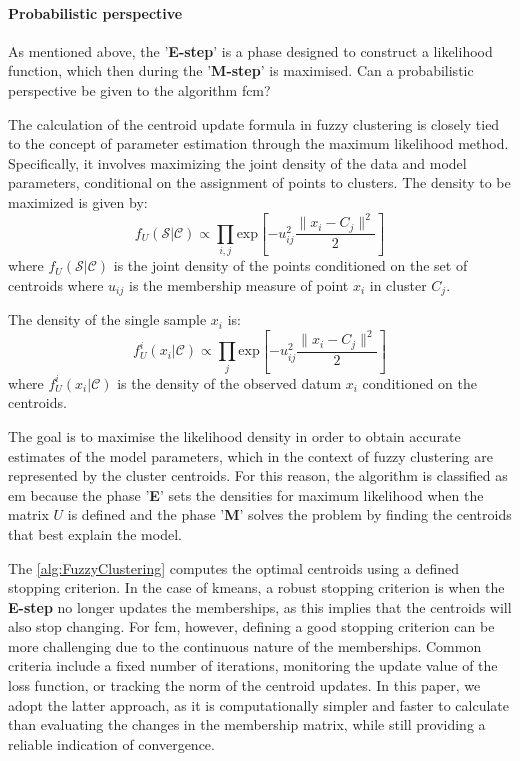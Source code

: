 \begin{remark}
	\paragraph{Probabilistic perspective}
	\begin{toReview}
	As mentioned above, the '\textbf{E-step}' is a phase designed to construct a likelihood function, which then during the '\textbf{M-step}' is maximised. Can a probabilistic perspective be given to the algorithm \gls{fcm}?
	\end{toReview}

	\noindent The calculation of the centroid update formula in fuzzy clustering is closely tied to the concept of parameter estimation through the maximum likelihood method. Specifically, it involves maximizing the joint density of the data and model parameters, conditional on the assignment of points to clusters.
	The density to be maximized is given by:
	\begin{equation*}
	    f_U(\mathcal{S}|\mathcal{C}) \propto \prod_{i,j}\text{exp}\left[-u_{ij}^2\frac{\|x_i-C_j\|^2}{2}\right]
	\end{equation*}
	where $f_U(\mathcal{S}|\mathcal{C})$ is the joint density of the points conditioned on the set of centroids where $u_{ij}$ is the membership measure of point $x_i$ in cluster $C_j$.

	\noindent The density of the single sample $x_i$ is:
	\begin{equation*}
	    f_U^i(x_i|\mathcal{C}) \propto \prod_{j}\text{exp}\left[-u_{ij}^2\frac{\|x_i-C_j\|^2}{2}\right]
	\end{equation*}
	where $f_U^i(x_i|\mathcal{C})$ is the density of the observed datum $x_i$ conditioned on the centroids.

	\noindent The goal is to maximise the likelihood density in order to obtain accurate estimates of the model parameters, which in the context of fuzzy clustering are represented by the cluster centroids. For this reason, the algorithm is classified as \gls{em} because the phase '\textbf{E}' sets the densities for maximum likelihood when the matrix $U$ is defined and the phase '\textbf{M}' solves the problem by finding the centroids that best explain the model.
\end{remark}

\begin{modified}
\noindent The \cref{alg:FuzzyClustering} computes the optimal centroids using a defined stopping criterion. In the case of \gls{kmeans}, a robust stopping criterion is when the \textbf{E-step} no longer updates the memberships, as this implies that the centroids will also stop changing. For \gls{fcm}, however, defining a good stopping criterion can be more challenging due to the continuous nature of the memberships. Common criteria include a fixed number of iterations, monitoring the update value of the loss function, or tracking the norm of the centroid updates. In this paper, we adopt the latter approach, as it is computationally simpler and faster to calculate than evaluating the changes in the membership matrix, while still providing a reliable indication of convergence.
\end{modified}

